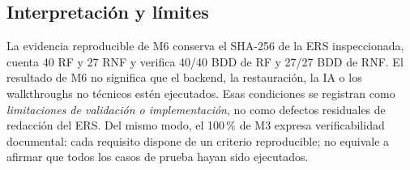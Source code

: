 \subsection{Interpretación y límites}
La evidencia reproducible de M6 conserva el SHA-256 de la ERS inspeccionada, cuenta 40 RF y 27 RNF y verifica 40/40 BDD de RF y 27/27 BDD de RNF. El resultado de M6 no significa que el backend, la restauración, la IA o los walkthroughs no técnicos estén ejecutados. Esas condiciones se registran como \emph{limitaciones de validación o implementación}, no como defectos residuales de redacción del ERS. Del mismo modo, el 100\,\% de M3 expresa verificabilidad documental: cada requisito dispone de un criterio reproducible; no equivale a afirmar que todos los casos de prueba hayan sido ejecutados.
